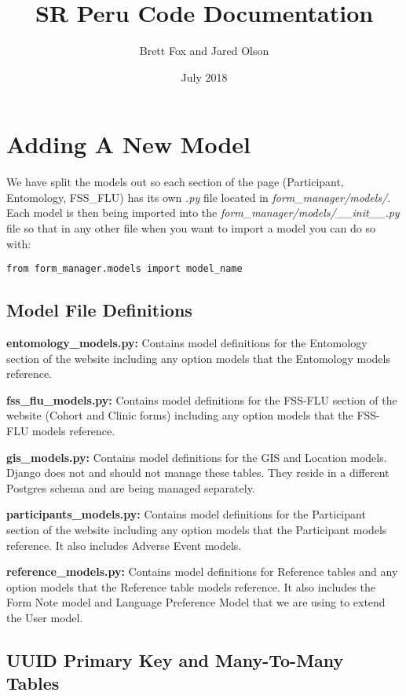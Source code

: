 \documentclass{article}
\title{ SR Peru Code Documentation}
\author{ Brett Fox and Jared Olson }
\date{ July 2018 }
\begin{document}
\maketitle

\newpage
\tableofcontents
\newpage

\section{Adding A New Model}
We have split the models out so each section of the page (Participant, Entomology, FSS\_FLU) has its own \textit{.py} file located in \textit{form\_manager/models/}.  Each model is then being imported into the \textit{form\_manager/models/\_\_init\_\_.py} file so that in any other file when you want to import a model you can do so with:
\begin{verbatim}
from form_manager.models import model_name
\end{verbatim}
\subsection{Model File Definitions}
\textbf{entomology\_models.py:} Contains model definitions for the Entomology section of the website including any option models that the Entomology models reference.

\textbf{fss\_flu\_models.py:} Contains model definitions for the FSS-FLU section of the website (Cohort and Clinic forms) including any option models that the FSS-FLU models reference.

\textbf{gis\_models.py:} Contains model definitions for the GIS and Location models.  Django does not and should not manage these tables.  They reside in a different Postgres schema and are being managed separately.

\textbf{participants\_models.py:} Contains model definitions for the Participant section of the website including any option models that the Participant models reference. It also includes Adverse Event models.

\textbf{reference\_models.py:} Contains model definitions for Reference tables and any option models that the Reference table models reference.  It also includes the Form Note model and Language Preference Model that we are using to extend the User model.

\subsection{UUID Primary Key and Many-To-Many Tables}
\end{document}
